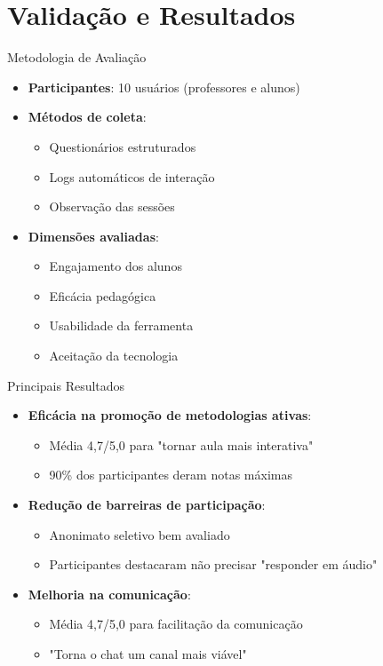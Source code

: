 \documentclass[aspectratio=169]{beamer}
\begin{document}
{\section{Validação e Resultados}

\begin{frame}{Metodologia de Avaliação}
  \begin{itemize}
  \item \textbf{Participantes}: 10 usuários (professores e alunos)
  \item \textbf{Métodos de coleta}:
    \begin{itemize}
    \item Questionários estruturados
    \item Logs automáticos de interação
    \item Observação das sessões
    \end{itemize}
  \item \textbf{Dimensões avaliadas}:
    \begin{itemize}
    \item Engajamento dos alunos
    \item Eficácia pedagógica
    \item Usabilidade da ferramenta
    \item Aceitação da tecnologia
    \end{itemize}
  \end{itemize}
\end{frame}

\begin{frame}{Principais Resultados}
  \begin{itemize}
  \item \textbf{Eficácia na promoção de metodologias ativas}:
    \begin{itemize}
    \item Média 4,7/5,0 para "tornar aula mais interativa"
    \item 90\% dos participantes deram notas máximas
    \end{itemize}
  \item \textbf{Redução de barreiras de participação}:
    \begin{itemize}
    \item Anonimato seletivo bem avaliado
    \item Participantes destacaram não precisar "responder em áudio"
    \end{itemize}
  \item \textbf{Melhoria na comunicação}:
    \begin{itemize}
    \item Média 4,7/5,0 para facilitação da comunicação
    \item "Torna o chat um canal mais viável"
    \end{itemize}
  \end{itemize}
\end{frame}

}
\end{document}
